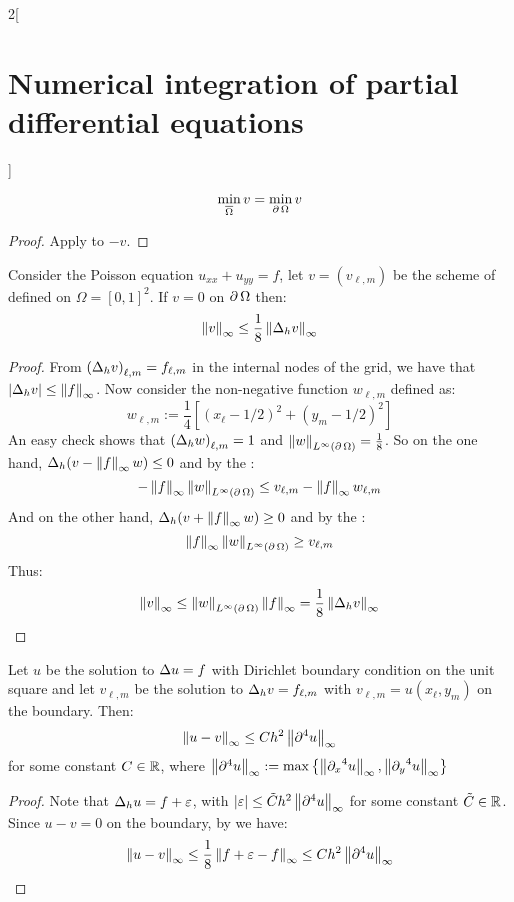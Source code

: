 \documentclass[../../../main_math.tex]{subfiles}
\begin{document}
\begin{multicols}{2}[\section{Numerical integration of partial differential equations}]
\begin{corollary}
    $$\min_{\overline{\Omega}} v=\min_{\operatorname{\partial}{\Omega}} v$$
  \end{corollary}
  \begin{proof}
    Apply  to $-v$.
  \end{proof}
  \begin{theorem}\label{NIPDE:pois_bound_V}
    Consider the Poisson equation $u_{xx}+u_{yy}=f$, let $v=(v_{\ell,m})$ be the scheme of  defined on $\Omega={[0,1]}^2$. If $v=0$ on $\operatorname{\partial}{\Omega}$ then:
    $$
      \left\|v\right\|_\infty\leq \frac{1}{8}\left\|\Delta_h v\right\|_\infty
    $$
  \end{theorem}
  \begin{proof}
    From ${(\Delta_h v)}_{\ell,m}=f_{\ell,m}$ in the internal nodes of the grid, we have that $\abs{\Delta_h v}\leq \left\|f\right\|_\infty$. Now consider the non-negative function $w_{\ell,m}$ defined as:
    $$
      w_{\ell,m}:= \frac{1}{4}\left[{\left(x_\ell-1/2\right)}^2+{\left(y_m-1/2\right)}^2\right]
    $$
    An easy check shows that ${(\Delta_h w)}_{\ell,m}=1$ and $\left\|w\right\|_{L^\infty(\operatorname{\partial}{\Omega})}=\frac{1}{8}$. So on the one hand, $\Delta_h(v-\left\|f\right\|_\infty w)\leq 0$ and by the :
    $$
      -\left\|f\right\|_\infty\left\|w\right\|_{L^\infty(\operatorname{\partial}{\Omega})}\leq v_{\ell,m}-\left\|f\right\|_\infty w_{\ell,m}
    $$
    And on the other hand, $\Delta_h(v+\left\|f\right\|_\infty w)\geq 0$ and by the :
    $$
      \left\|f\right\|_\infty\left\|w\right\|_{L^\infty(\operatorname{\partial}{\Omega})}\geq v_{\ell,m}
    $$
    Thus:
    $$
      \left\|v\right\|_\infty\leq \left\|w\right\|_{L^\infty(\operatorname{\partial}{\Omega})}\left\|f\right\|_\infty= \frac{1}{8}\left\|\Delta_h v\right\|_\infty
    $$
  \end{proof}
  \begin{theorem}
    Let $u$ be the solution to $\Delta u=f$ with Dirichlet boundary condition on the unit square and let $v_{\ell,m}$ be the solution to $\Delta_h v=f_{\ell,m}$ with $v_{\ell,m}=u(x_\ell,y_m)$ on the boundary. Then:
    $$
      \left\|u-v\right\|_\infty\leq C h^2\left\|\partial^4u\right\|_\infty
    $$
    for some constant $C\in\mathbb{R}$, where $\left\|\partial^4u\right\|_\infty:=\max\left\{\left\|{\partial_x}^4u\right\|_\infty,\left\|{\partial_y}^4u\right\|_\infty\right\}$
  \end{theorem}
  \begin{proof}
    Note that $\Delta_h u=f+\varepsilon$, with $\abs{\varepsilon}\leq \tilde{C} h^2\left\|\partial^4u\right\|_\infty$ for some constant $\tilde{C}\in\mathbb{R}$. Since $u-v=0$ on the boundary, by  we have:
    $$
      \left\|u-v\right\|_\infty\leq\frac{1}{8}\left\|f+\varepsilon -f\right\|_\infty\leq C h^2\left\|\partial^4u\right\|_\infty
    $$
  \end{proof}

\end{multicols}
\end{document}
